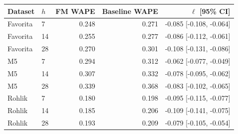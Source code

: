 \begin{tabular}{llrrr}
\toprule
Dataset & $h$ & FM WAPE & Baseline WAPE & $\ell$ [95\% CI] \\
\midrule
Favorita & 7 & 0.248 & 0.271 & -0.085 [-0.108, -0.064] \\
Favorita & 14 & 0.255 & 0.277 & -0.086 [-0.112, -0.061] \\
Favorita & 28 & 0.270 & 0.301 & -0.108 [-0.131, -0.086] \\
M5 & 7 & 0.294 & 0.312 & -0.062 [-0.077, -0.049] \\
M5 & 14 & 0.307 & 0.332 & -0.078 [-0.095, -0.062] \\
M5 & 28 & 0.339 & 0.368 & -0.083 [-0.102, -0.065] \\
Rohlik & 7 & 0.180 & 0.198 & -0.095 [-0.115, -0.077] \\
Rohlik & 14 & 0.185 & 0.206 & -0.109 [-0.141, -0.075] \\
Rohlik & 28 & 0.193 & 0.209 & -0.079 [-0.105, -0.054] \\
\bottomrule
\end{tabular}
